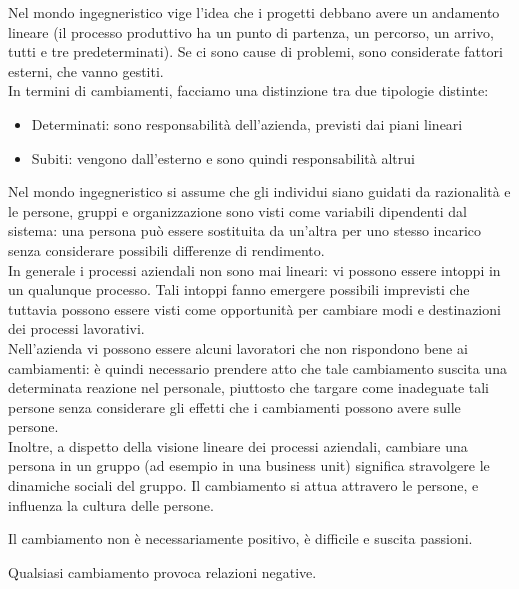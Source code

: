 Nel mondo ingegneristico vige l'idea che i progetti debbano avere un andamento
lineare (il processo produttivo ha un punto di partenza, un percorso, un arrivo,
tutti e tre predeterminati). Se ci sono cause di problemi, sono considerate
fattori esterni, che vanno gestiti. \\
In termini di cambiamenti, facciamo una distinzione tra due tipologie distinte:
\begin{itemize}
  \item Determinati: sono responsabilit\`a dell'azienda, previsti dai piani lineari
  \item Subiti: vengono dall'esterno e sono quindi responsabilit\`a altrui
\end{itemize}
Nel mondo ingegneristico si assume che gli individui siano guidati da
razionalit\`a e le persone, gruppi e organizzazione sono visti come variabili
dipendenti dal sistema: una persona pu\`o essere sostituita da un'altra per uno
stesso incarico senza considerare possibili differenze di rendimento. \\
In generale i processi aziendali non sono mai lineari: vi possono essere intoppi
in un qualunque processo. Tali intoppi fanno emergere possibili imprevisti che
tuttavia possono essere visti come opportunit\`a per cambiare modi e
destinazioni dei processi lavorativi. \\
Nell'azienda vi possono essere alcuni lavoratori che non rispondono bene ai
cambiamenti: \`e quindi necessario prendere atto che tale cambiamento suscita
una determinata reazione nel personale, piuttosto che targare come inadeguate
tali persone senza considerare gli effetti che i cambiamenti possono avere sulle
persone. \\
Inoltre, a dispetto della visione lineare dei processi aziendali, cambiare una
persona in un gruppo (ad esempio in una business unit) significa stravolgere le
dinamiche sociali del gruppo. Il cambiamento si attua attravero le persone, e 
influenza la cultura delle persone.

Il cambiamento non \`e necessariamente positivo, \`e difficile e suscita
passioni.

Qualsiasi cambiamento provoca relazioni negative.
